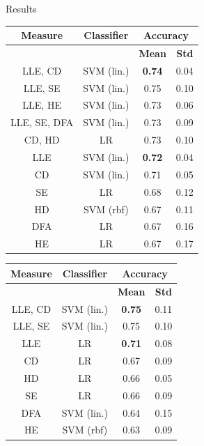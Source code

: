 \documentclass{beamer}
\begin{document}
\begin{frame}{Results}

\begin{table}[tbp]
\fontsize{7pt}{10pt}
\selectfont
  \parbox{0.495\linewidth}{
\centering
\begin{tabular}{|c|c|c|c|}
\hline
\textbf{Measure} & \textbf{Classifier} & \multicolumn{2}{c}{\textbf{Accuracy}} \vline \\ \hline
& & \textbf{Mean} & \textbf{Std} \\ \hline
LLE, CD & SVM (lin.) & \textbf{0.74} & 0.04 \\ \hline 
LLE, SE & SVM (lin.) & 0.75 & 0.10 \\ \hline 
LLE, HE & SVM (lin.) & 0.73 & 0.06 \\ \hline 
LLE, SE, DFA & SVM (lin.) & 0.73 & 0.09 \\ \hline 
CD, HD & LR & 0.73 & 0.10 \\ \hhline{=|=|=|=}
LLE & SVM (lin.) & \textbf{0.72} & 0.04 \\ \hline
CD & SVM (lin.) & 0.71 & 0.05 \\ \hline 
SE & LR & 0.68 & 0.12 \\ \hline
HD & SVM (rbf) & 0.67 & 0.11 \\ \hline
DFA & LR & 0.67 & 0.16 \\ \hline
HE & LR & 0.67 & 0.17 \\ \hline
\end{tabular}
}
\hfill
  \parbox{0.495\linewidth}{
\centering
\begin{tabular}{|c|c|c|c|}
\hline
\textbf{Measure} & \textbf{Classifier} & \multicolumn{2}{c}{\textbf{Accuracy}} \vline \\ \hline
& & \textbf{Mean} & \textbf{Std} \\ \hline
LLE, CD & SVM (lin.) & \textbf{0.75} & 0.11 \\ \hline 
LLE, SE & SVM (lin.) & 0.75 & 0.10 \\ \hhline{=|=|=|=}
LLE & LR & \textbf{0.71}  & 0.08 \\ \hline 
CD & LR & 0.67 & 0.09 \\ \hline
HD & LR & 0.66 & 0.05 \\ \hline
SE & LR & 0.66 & 0.09 \\ \hline
DFA & SVM (lin.) & 0.64 & 0.15 \\ \hline
HE & SVM (rbf) & 0.63 & 0.09 \\ \hline
\end{tabular}
}
\end{table}
\end{frame}
\end{document}
